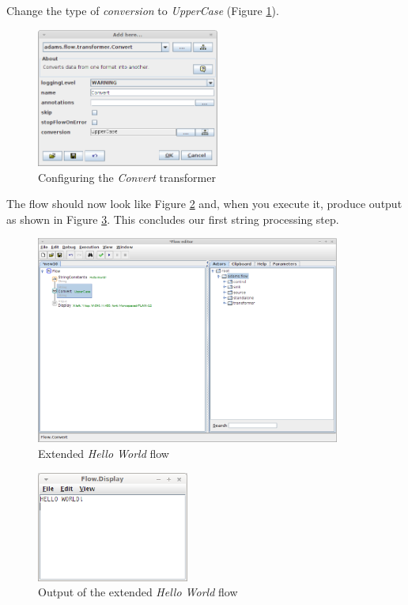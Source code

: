 Change the type of \textit{conversion} to \textit{UpperCase} (Figure
\ref{floweditor-helloworld-processdata3}).

\begin{figure}[htb]
  \centering
  \includegraphics[width=6.0cm]{images/floweditor-helloworld-processdata3.png}
  \caption{Configuring the \textit{Convert} transformer}
  \label{floweditor-helloworld-processdata3}
\end{figure}

The flow should now look like Figure \ref{floweditor-helloworld-processdata4}
and, when you execute it, produce output as shown in Figure
\ref{floweditor-helloworld-processdata5}. This concludes our first
string processing step.

\begin{figure}[htb]
  \centering
  \includegraphics[width=10.0cm]{images/floweditor-helloworld-processdata4.png}
  \caption{Extended \textit{Hello World} flow}
  \label{floweditor-helloworld-processdata4}
\end{figure}

\begin{figure}[htb]
  \centering
  \includegraphics[width=5.0cm]{images/floweditor-helloworld-processdata5.png}
  \caption{Output of the extended \textit{Hello World} flow}
  \label{floweditor-helloworld-processdata5}
\end{figure}

